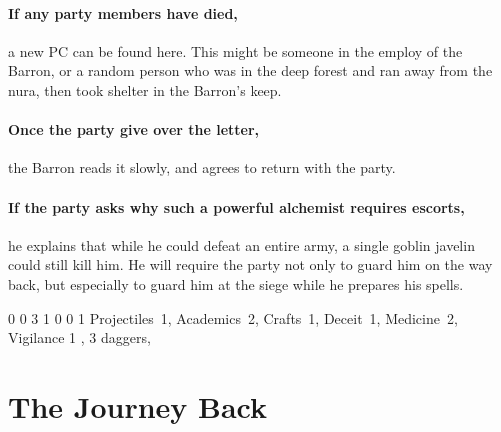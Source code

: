 \begin{multicols}{2}

\paragraph{If any party members have died,}
a new PC can be found here.
This might be someone in the employ of the Barron, or a random person who was in the deep forest and ran away from the nura, then took shelter in the Barron's keep.

\paragraph{Once the party give over the letter,}
the Barron reads it slowly, and agrees to return with the party.

\paragraph{If the party asks why such a powerful alchemist requires escorts,}
he explains that while he could defeat an entire army, a single goblin javelin could still kill him.
He will require the party not only to guard him on the way back, but especially to guard him at the siege while he prepares his spells.

{0}%
{0}%
{{3}%
{1}%
{0}}%
{0}%
{1}%
{Projectiles~1, Academics~2, Crafts~1, Deceit~1, Medicine~2, Vigilance 1
}%
{\shortsword, 3 daggers, \partialleather}%
{\addtocounter{fp}{10}}

\end{multicols}

\section{The Journey Back}
\label{siege}

